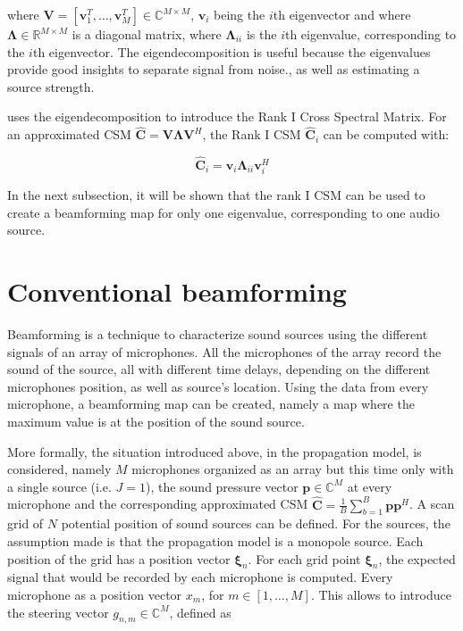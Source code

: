 \documentclass[11pt,a4paper,twoside]{report}
\begin{document}
where $\mathbf{V} = [\mathbf{v}_1^T, \dots, \mathbf{v}_M^T] \in \mathbb{C}^{M \times M}$, $\mathbf{v}_i$ being the $i$th eigenvector and where $\mathbf{\Lambda} \in \mathbb{R}^{M \times M}$ is a diagonal matrix, where $\mathbf{\Lambda}_{ii}$ is the $i$th eigenvalue, corresponding to the $i$th eigenvector. The eigendecomposition is useful because the eigenvalues provide good insights to separate signal from noise., as well as estimating a source strength. 

\cite{sarradj2010fast} uses the eigendecomposition to introduce the Rank I Cross Spectral Matrix. For an approximated CSM $\hat{\mathbf{C}} = \mathbf{V} \mathbf{\Lambda} \mathbf{V}^H$, the Rank I CSM $\hat{\mathbf{C}}_i$ can be computed with:

\begin{equation}
    \label{rank_I_csm}
    \hat{\mathbf{C}}_i = \mathbf{v}_i \mathbf{\Lambda}_{ii} \mathbf{v}_{i}^{H}
\end{equation}

In the next subsection, it will be shown that the rank I CSM can be used to create a beamforming map for only one eigenvalue, corresponding to one audio source. 

\section{Conventional beamforming}

Beamforming is a technique to characterize sound sources using the different signals of an array of microphones. All the microphones of the array record the sound of the source, all with different time delays, depending on the different microphones position, as well as source's location. Using the data from every microphone, a beamforming map can be created, namely a map where the maximum value is at the position of the sound source.

More formally, the situation introduced above, in the propagation model, is considered, namely $M$ microphones organized as an array but this time only with a single source (i.e. $J = 1$), the sound pressure vector $\mathbf{p} \in \mathbb{C}^M$ at every microphone and the corresponding approximated CSM $\hat{\mathbf{C}} = \frac{1}{B} \sum_{b = 1}^{B} \mathbf{p}\mathbf{p}^H$. A scan grid of $N$ potential position of sound sources can be defined. For the sources, the assumption made is that the propagation model is a monopole source. Each position of the grid has a position vector $\mathbf{\xi}_n$. For each grid point $\mathbf{\xi}_n$, the expected signal that would be recorded by each microphone is computed. Every microphone as a position vector $x_m$, for $m \in [1, \dots, M]$. This allows to introduce the  steering vector $g_{n,m} \in \mathbb{C}^M$, defined as 
\end{document}
